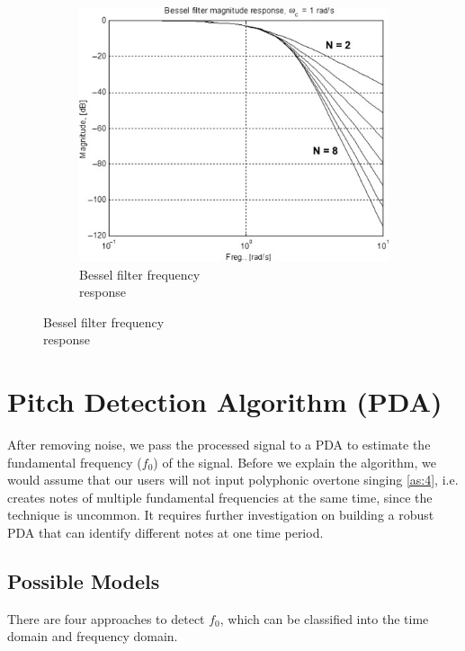 \begin{figure}[h]
\begin{subfigure}{.4\textwidth}
		\includegraphics[width=1\linewidth]{Figures/bessel.jpg}
		\caption{Bessel filter frequency\\response}
		\label{fig:sub3}
	\end{subfigure}

\end{figure}

\section{Pitch Detection Algorithm (PDA)}
\label{sec:PDA}
After removing noise, we pass the processed signal to a PDA to estimate the fundamental frequency ($f_0$) of
the signal. Before we explain the algorithm, we would assume that our users will not input polyphonic overtone 
singing \cref{as:4}, i.e. creates notes of multiple fundamental frequencies at the same time, since the technique is uncommon. 
It requires further investigation on building a robust PDA that can identify different notes at one time period.

\subsection{Possible Models}
There are four approaches to detect $f_0$, which can be classified into the time domain and frequency domain.

